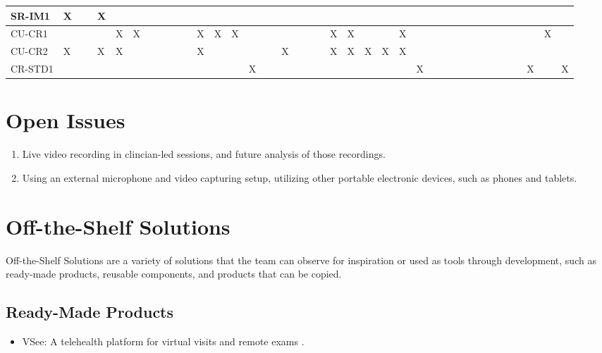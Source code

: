 \documentclass[12pt]{article}
\begin{document}
\begin{table}[H]
{\begin{tabular}{|l|l|l|l|l|l|l|l|l|l|l|l|l|l|l|l|l|l|l|l|l|l|l|l|l|l|l|l|l|l|l|l|}
      SR-IM1 & X & ~ & X & ~ & ~ & ~ & ~ & ~ & ~ & ~ & ~ & ~ & ~ & ~ & ~ & ~ & ~ & ~ & ~ & ~ & ~ & ~ & ~ & ~ & ~ & ~ & ~ & ~ & ~ & ~ & ~ \\ \hline
      CU-CR1 & ~ & ~ & ~ & X & X & ~ & ~ & ~ & X & X & X & ~ & ~ & ~ & ~ & ~ & X & X & ~ & ~ & X & ~ & ~ & ~ & ~ & ~ & ~ & ~ & ~ & X & ~ \\ \hline
      CU-CR2 & X & ~ & X & X & ~ & ~ & ~ & ~ & X & ~ & ~ & ~ & ~ & X & ~ & ~ & X & X & X & X & X & ~ & ~ & ~ & ~ & ~ & ~ & ~ & ~ & ~ & ~ \\ \hline
      CR-STD1 & ~ & ~ & ~ & ~ & ~ & ~ & ~ & ~ & ~ & ~ & ~ & X & ~ & ~ & ~ & ~ & ~ & ~ & ~ & ~ & ~ & X & ~ & ~ & ~ & ~ & ~ & ~ & X & ~ & X \\ \hline
  \end{tabular}}
\end{table}

\newpage

\section{Open Issues}
\begin{enumerate}
  \item Live video recording in clincian-led sessions, and future analysis of those recordings.
  \item Using an external microphone and video capturing setup, utilizing other portable electronic devices, such as phones and tablets.
\end{enumerate}

\newpage

\section{Off-the-Shelf Solutions}
\hspace{2em}Off-the-Shelf Solutions are a variety of solutions that the team can observe for inspiration or used as tools through development, such as ready-made products, reusable components, and products that can be copied.
\subsection{Ready-Made Products}
\begin{itemize}
  \item VSee: A telehealth platform for virtual visits and remote exams \cite{vsee}.
\end{itemize}
\end{document}
